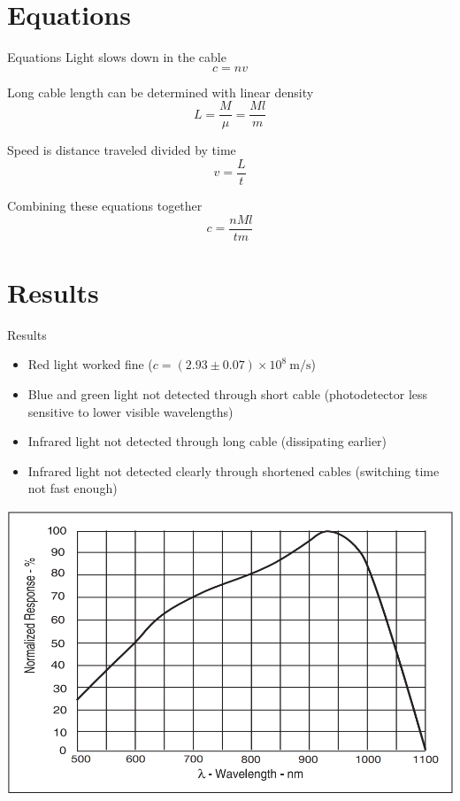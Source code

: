 \documentclass{beamer}
\begin{document}
\section{Equations}
\begin{frame}{Equations}
  Light slows down in the cable
  \begin{equation}
    c = n v
  \end{equation}

  Long cable length can be determined with linear density
  \begin{equation}
    L = \frac{M}{\mu} = \frac{Ml}{m}
  \end{equation}

  Speed is distance traveled divided by time
  \begin{equation}
    v = \frac{L}{t}    
  \end{equation}

  Combining these equations together
  \begin{equation}
    c = \frac{nMl}{tm}
  \end{equation}
\end{frame}

\section{Results}
\begin{frame}{Results}
  \begin{itemize}
    \item Red light worked fine ($c = (2.93 \pm 0.07) \times 10^8~\mathrm{m/s}$)
    \item Blue and green light not detected through short cable (photodetector less sensitive to lower visible wavelengths)
    \item Infrared light not detected through long cable (dissipating earlier)
    \item Infrared light not detected clearly through shortened cables (switching time not fast enough)
  \end{itemize}
  \begin{center}
    \includegraphics[height=0.4\textheight]{../detector-response-vs-wavelength.png}
  \end{center}
\end{frame}
\end{document}
